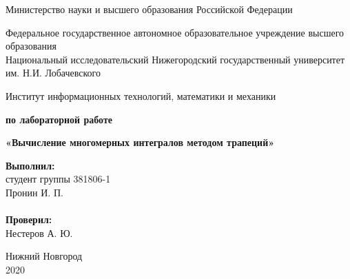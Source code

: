 \documentclass{report}
\begin{document}
	
	\begin{titlepage}
		
		\begin{center}
			Министерство науки и высшего образования Российской Федерации
		\end{center}
		
		\begin{center}
			Федеральное государственное автономное образовательное учреждение высшего образования \\
			Национальный исследовательский Нижегородский государственный университет им. Н.И. Лобачевского
		\end{center}
		
		\begin{center}
			Институт информационных технологий, математики и механики
		\end{center}
		
		\vspace{4em}
		
		\begin{center}
			\textbf{ по лабораторной работе} \\
		\end{center}
		\begin{center}
			\textbf{\Large«Вычисление многомерных интегралов методом трапеций»} \\
		\end{center}
		
		\vspace{4em}
		
		\newbox{\lbox}
		\newlength{\maxl}
		\setlength{\maxl}{\wd\lbox}
		\hfill\parbox{7cm}{
			\hspace*{5cm}\hspace*{-5cm}\textbf{Выполнил:} \\ студент группы 381806-1 \\ Пронин И. П.\\
			\\
			\hspace*{5cm}\hspace*{-5cm}\textbf{Проверил:}\\ Нестеров А. Ю.\\
		}
		\vspace{\fill}
		
		\begin{center} Нижний Новгород \\ 2020 \end{center}
		
	\end{titlepage}
	
\end{document}

